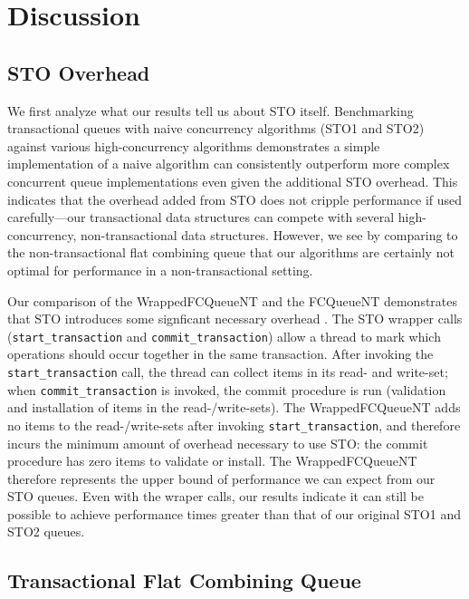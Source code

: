 \section{Discussion}

\subsection{STO Overhead}
We first analyze what our results tell us about STO itself. Benchmarking transactional queues with naive concurrency algorithms (STO1 and STO2) against various high-concurrency algorithms demonstrates a simple implementation of a naive algorithm can consistently outperform more complex concurrent queue implementations even given the additional STO overhead. This indicates that the overhead added from STO does not cripple performance if used carefully---our transactional data structures can compete with several high-concurrency, non-transactional data structures. However, we see by comparing to the non-transactional flat combining queue that our algorithms are certainly not optimal for performance in a non-transactional setting.

Our comparison of the WrappedFCQueueNT and the FCQueueNT demonstrates that STO introduces some signficant necessary overhead . The STO wrapper calls (\texttt{start\_transaction} and \texttt{commit\_transaction}) allow a thread to mark which operations should occur together in the same transaction. After invoking the \texttt{start\_transaction} call, the thread can collect items in its read- and write-set; when \texttt{commit\_transaction} is invoked, the commit procedure is run (validation and installation of items in the read-/write-sets). The WrappedFCQueueNT adds no items to the read-/write-sets after invoking \texttt{start\_transaction}, and therefore incurs the minimum amount of overhead necessary to use STO: the commit procedure has zero items to validate or install. The WrappedFCQueueNT therefore represents the upper bound of performance we can expect from our STO queues. Even with the wraper calls, our results indicate it can still be possible to achieve performance  times greater than that of our original STO1 and STO2 queues.

\subsection{Transactional Flat Combining Queue}

